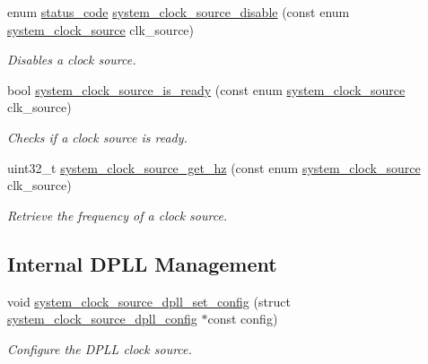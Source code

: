\begin{DoxyCompactItemize}
\item 
enum \hyperlink{group__group__sam0__utils__status__codes_ga751c892e5a46b8e7d282085a5a5bf151}{status\+\_\+code} \hyperlink{group__asfdoc__sam0__system__clock__group_gacea9ce7a68fc3b0b2a46f3a8c3d6d89b}{system\+\_\+clock\+\_\+source\+\_\+disable} (const enum \hyperlink{group__asfdoc__sam0__system__clock__group_ga86882dc960f2552722e9713da97fcc58}{system\+\_\+clock\+\_\+source} clk\+\_\+source)
\begin{DoxyCompactList}\small\item\em Disables a clock source. \end{DoxyCompactList}\item 
bool \hyperlink{group__asfdoc__sam0__system__clock__group_ga2f18617c9770bf1c3ab8fdac5081e65e}{system\+\_\+clock\+\_\+source\+\_\+is\+\_\+ready} (const enum \hyperlink{group__asfdoc__sam0__system__clock__group_ga86882dc960f2552722e9713da97fcc58}{system\+\_\+clock\+\_\+source} clk\+\_\+source)
\begin{DoxyCompactList}\small\item\em Checks if a clock source is ready. \end{DoxyCompactList}\item 
uint32\+\_\+t \hyperlink{group__asfdoc__sam0__system__clock__group_ga1894d901b7ed10e4c1e52a784c8962be}{system\+\_\+clock\+\_\+source\+\_\+get\+\_\+hz} (const enum \hyperlink{group__asfdoc__sam0__system__clock__group_ga86882dc960f2552722e9713da97fcc58}{system\+\_\+clock\+\_\+source} clk\+\_\+source)
\begin{DoxyCompactList}\small\item\em Retrieve the frequency of a clock source. \end{DoxyCompactList}\end{DoxyCompactItemize}
\subsection*{Internal D\+P\+L\+L Management}
\begin{DoxyCompactItemize}
\item 
void \hyperlink{group__asfdoc__sam0__system__clock__group_ga9f77933df42fc50863b858b7d4201874}{system\+\_\+clock\+\_\+source\+\_\+dpll\+\_\+set\+\_\+config} (struct \hyperlink{structsystem__clock__source__dpll__config}{system\+\_\+clock\+\_\+source\+\_\+dpll\+\_\+config} $\ast$const config)
\begin{DoxyCompactList}\small\item\em Configure the D\+P\+L\+L clock source. \end{DoxyCompactList}\end{DoxyCompactItemize}
